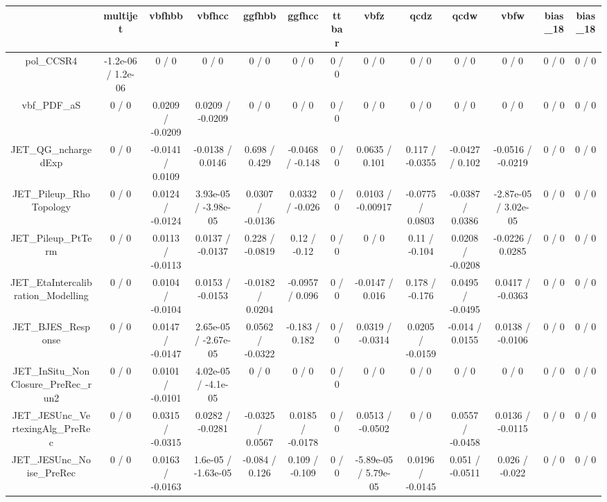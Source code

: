 \documentclass[10pt]{article}
\begin{document}
\begin{table}[htbp]
\begin{center}
\begin{tabular}{|c|c|c|c|c|c|c|c|c|c|c|c|c|}
\hline 
      & multijet      & vbfhbb      & vbfhcc      & ggfhbb      & ggfhcc      & ttbar      & vbfz      & qcdz      & qcdw      & vbfw      & bias_18      & bias_18 \\ 
\hline 
  pol_CCSR4 & -1.2e-06 / 1.2e-06 & 0 / 0 & 0 / 0 & 0 / 0 & 0 / 0 & 0 / 0 & 0 / 0 & 0 / 0 & 0 / 0 & 0 / 0 & 0 / 0 & 0 / 0 \\ 
  vbf_PDF_aS & 0 / 0 & 0.0209 / -0.0209 & 0.0209 / -0.0209 & 0 / 0 & 0 / 0 & 0 / 0 & 0 / 0 & 0 / 0 & 0 / 0 & 0 / 0 & 0 / 0 & 0 / 0 \\ 
  JET_QG_nchargedExp & 0 / 0 & -0.0141 / 0.0109 & -0.0138 / 0.0146 & 0.698 / 0.429 & -0.0468 / -0.148 & 0 / 0 & 0.0635 / 0.101 & 0.117 / -0.0355 & -0.0427 / 0.102 & -0.0516 / -0.0219 & 0 / 0 & 0 / 0 \\ 
  JET_Pileup_RhoTopology & 0 / 0 & 0.0124 / -0.0124 & 3.93e-05 / -3.98e-05 & 0.0307 / -0.0136 & 0.0332 / -0.026 & 0 / 0 & 0.0103 / -0.00917 & -0.0775 / 0.0803 & -0.0387 / 0.0386 & -2.87e-05 / 3.02e-05 & 0 / 0 & 0 / 0 \\ 
  JET_Pileup_PtTerm & 0 / 0 & 0.0113 / -0.0113 & 0.0137 / -0.0137 & 0.228 / -0.0819 & 0.12 / -0.12 & 0 / 0 & 0 / 0 & 0.11 / -0.104 & 0.0208 / -0.0208 & -0.0226 / 0.0285 & 0 / 0 & 0 / 0 \\ 
  JET_EtaIntercalibration_Modelling & 0 / 0 & 0.0104 / -0.0104 & 0.0153 / -0.0153 & -0.0182 / 0.0204 & -0.0957 / 0.096 & 0 / 0 & -0.0147 / 0.016 & 0.178 / -0.176 & 0.0495 / -0.0495 & 0.0417 / -0.0363 & 0 / 0 & 0 / 0 \\ 
  JET_BJES_Response & 0 / 0 & 0.0147 / -0.0147 & 2.65e-05 / -2.67e-05 & 0.0562 / -0.0322 & -0.183 / 0.182 & 0 / 0 & 0.0319 / -0.0314 & 0.0205 / -0.0159 & -0.014 / 0.0155 & 0.0138 / -0.0106 & 0 / 0 & 0 / 0 \\ 
  JET_InSitu_NonClosure_PreRec_run2 & 0 / 0 & 0.0101 / -0.0101 & 4.02e-05 / -4.1e-05 & 0 / 0 & 0 / 0 & 0 / 0 & 0 / 0 & 0 / 0 & 0 / 0 & 0 / 0 & 0 / 0 & 0 / 0 \\ 
  JET_JESUnc_VertexingAlg_PreRec & 0 / 0 & 0.0315 / -0.0315 & 0.0282 / -0.0281 & -0.0325 / 0.0567 & 0.0185 / -0.0178 & 0 / 0 & 0.0513 / -0.0502 & 0 / 0 & 0.0557 / -0.0458 & 0.0136 / -0.0115 & 0 / 0 & 0 / 0 \\ 
  JET_JESUnc_Noise_PreRec & 0 / 0 & 0.0163 / -0.0163 & 1.6e-05 / -1.63e-05 & -0.084 / 0.126 & 0.109 / -0.109 & 0 / 0 & -5.89e-05 / 5.79e-05 & 0.0196 / -0.0145 & 0.051 / -0.0511 & 0.026 / -0.022 & 0 / 0 & 0 / 0 \\ 

\end{tabular}
\end{center}
\end{table}
\end{document}
